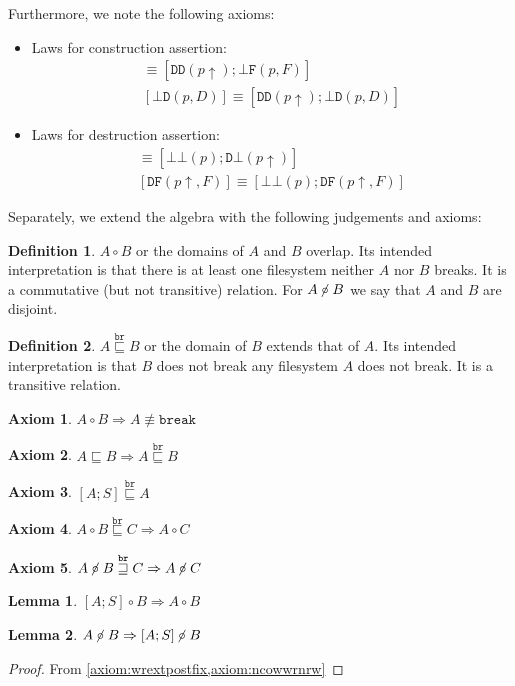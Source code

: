 \documentclass[12pt]{article}
\newcommand{\empt}{\bot}
\newcommand{\pp}{p\!\!\uparrow} %
\newcommand{\cbrk}{\mathtt{break}}
\newcommand{\fscommand}[2]{{#1#2}}
\newcommand{\fsregcommandchar}[1]{\mathtt{#1}}
\newcommand{\fsregcommand}[2]{\fscommand{\fsregcommandchar{#1}}{\fsregcommandchar{#2}}}
\newcommand{\cbb}{\fsregcommand{\empt}{\empt}}
\newcommand{\cbf}{\fsregcommand{\empt}{F}}
\newcommand{\cbd}{\fsregcommand{\empt}{D}}
\newcommand{\cdb}{\fsregcommand{D}{\empt}}
\newcommand{\cdf}{\fsregcommand{D}{F}}
\newcommand{\cdd}{\fsregcommand{D}{D}}
\newcommand{\eqext}{\sqsubseteq}
\newcommand{\nequiv}{\not\equiv}
\newcommand{\wrext}{\stackrel{\mathtt{br}}{\sqsubseteq}}
\newcommand{\wrnrw}{\stackrel{\mathtt{br}}{\sqsupseteq}}
\newcommand{\coworks}{\circ}
\newcommand{\ncoworks}{\centernot\circ}
\theoremstyle{definition}
\newtheorem{mydef}{Definition}
\newtheorem{myax}{Axiom}
\newtheorem{mylem}{Lemma}
\begin{document}
Furthermore, we note the following axioms:

\begin{itemize}
\item Laws for construction assertion:
   \begin{gather*}
            [\cbf(p, F)] \equiv [\cdd(\pp); \cbf(p, F)]\\
            [\cbd(p, D)] \equiv [\cdd(\pp); \cbd(p, D)]
   \end{gather*}
\item Laws for destruction assertion:
   \begin{gather*}
            [\cdb(\pp)] \equiv [\cbb(p); \cdb(\pp)]\\
            [\cdf(\pp, F)] \equiv [\cbb(p); \cdf(\pp, F)]
   \end{gather*}
\end{itemize}

Separately, we extend the algebra with the following judgements and axioms:

\begin{mydef}{$A\coworks B$}
or the domains of $A$ and $B$ overlap.
Its intended interpretation is that
there is at least one filesystem neither $A$ nor $B$ breaks.
It is a commutative (but not transitive) relation.
For $A\ncoworks B$ we say that $A$ and $B$ are disjoint.
\end{mydef}

\begin{mydef}{$A\wrext B$}
or the domain of $B$ extends that of $A$.
Its intended interpretation is that
$B$ does not break any filesystem $A$ does not break.
It is a transitive relation.
\end{mydef}

\begin{myax}$A\coworks B \Rightarrow A\nequiv\cbrk$\end{myax}
\begin{myax}$A\eqext B \Rightarrow A\wrext B$\end{myax}
\begin{myax}\label{axiom:wrextpostfix}$[A;S] \wrext A$\end{myax}
\begin{myax}$A\coworks B\wrext C \Rightarrow A\coworks C$\end{myax}
\begin{myax}\label{axiom:ncowwrnrw}$A\ncoworks B\wrnrw C \Rightarrow A\ncoworks C$\end{myax}

\begin{mylem}\label{lemma:cowdelfix}$[A;S]\coworks B \Rightarrow A\coworks B$\end{mylem}
\begin{mylem}\label{lemma:ncowpostfix}$A\ncoworks B \Rightarrow [A;S]\ncoworks B$\end{mylem}
\begin{proof}From \cref{axiom:wrextpostfix,axiom:ncowwrnrw}\end{proof}
\end{document}
